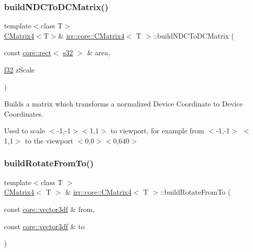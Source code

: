 \subsubsection{\texorpdfstring{build\+N\+D\+C\+To\+D\+C\+Matrix()}{buildNDCToDCMatrix()}\hspace{0.1cm}{\footnotesize\ttfamily [2/2]}}
{\footnotesize\ttfamily template$<$class T$>$ \\
\hyperlink{classirr_1_1core_1_1CMatrix4}{C\+Matrix4}$<$T$>$\& \hyperlink{classirr_1_1core_1_1CMatrix4}{irr\+::core\+::\+C\+Matrix4}$<$ T $>$\+::build\+N\+D\+C\+To\+D\+C\+Matrix (\begin{DoxyParamCaption}\item[{const \hyperlink{classirr_1_1core_1_1rect}{core\+::rect}$<$ \hyperlink{namespaceirr_ac66849b7a6ed16e30ebede579f9b47c6}{s32} $>$ \&}]{area,  }\item[{\hyperlink{namespaceirr_a0277be98d67dc26ff93b1a6a1d086b07}{f32}}]{z\+Scale }\end{DoxyParamCaption})}



Builds a matrix which transforms a normalized Device Coordinate to Device Coordinates. 

Used to scale $<$-\/1,-\/1$>$$<$1,1$>$ to viewport, for example from $<$-\/1,-\/1$>$ $<$1,1$>$ to the viewport $<$0,0$>$$<$0,640$>$ \mbox{\label{classirr_1_1core_1_1CMatrix4_a4802c6a89ad813e2919f68f512fb320f}} 
\subsubsection{\texorpdfstring{build\+Rotate\+From\+To()}{buildRotateFromTo()}\hspace{0.1cm}{\footnotesize\ttfamily [1/2]}}
{\footnotesize\ttfamily template$<$class T $>$ \\
\hyperlink{classirr_1_1core_1_1CMatrix4}{C\+Matrix4}$<$ T $>$ \& \hyperlink{classirr_1_1core_1_1CMatrix4}{irr\+::core\+::\+C\+Matrix4}$<$ T $>$\+::build\+Rotate\+From\+To (\begin{DoxyParamCaption}\item[{const \hyperlink{namespaceirr_1_1core_ae6e2b2a6c552833ebbd5b7463d03586b}{core\+::vector3df} \&}]{from,  }\item[{const \hyperlink{namespaceirr_1_1core_ae6e2b2a6c552833ebbd5b7463d03586b}{core\+::vector3df} \&}]{to }\end{DoxyParamCaption})\hspace{0.3cm}{\ttfamily [inline]}}



